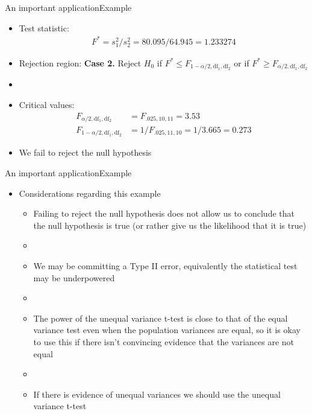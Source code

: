 \documentclass[xcolor=dvipsnames]{beamer}
\begin{document}
\begin{frame}{An important application}{Example}
	\begin{itemize}
		\item Test statistic:
		\begin{gather*}
		F^* = s_1^2 /s_2^2 =  80.095 / 64.945 = 1.233274
		\end{gather*}
		\item Rejection region: \textbf{Case 2.} Reject $H_0$ if $F^* \leq F_{1-\alpha / 2, \text{df}_1,\text{df}_2}$ or if $F^* \geq F_{\alpha / 2, \text{df}_1,\text{df}_2} $
		\item[]
		\item Critical values: \pause
		\begin{align*}
			F_{\alpha/2, \text{df}_1,\text{df}_2} &= F_{.025, 10, 11} = 3.53 \\
			F_{1-\alpha/2, \text{df}_1,\text{df}_2} &= 1 / F_{.025, 11, 10} = 1/3.665 = 0.273
		\end{align*} \pause
		\item We fail to reject the null hypothesis
	\end{itemize}
\end{frame}

\begin{frame}{An important application}{Example}
	\begin{itemize}
		\item Considerations regarding this example
		\begin{itemize}
			\item Failing to reject the null hypothesis does not allow us to conclude that the null hypothesis is true (or rather give us the likelihood that it is true) \pause
			\item[]
			\item We may be committing a Type II error, equivalently the statistical test may be underpowered \pause
			\item[]
			\item The power of the unequal variance t-test is close to that of the equal variance test even when the population variances are equal, so it is okay to use this if there isn't convincing evidence that the variances are not equal \pause
			\item[]
			\item If there is evidence of unequal variances we should use the unequal variance t-test
		\end{itemize}
	\end{itemize}
\end{frame}
\end{document}
